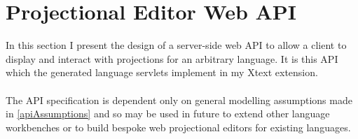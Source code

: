 \documentclass{article}
\begin{document}
\section{Projectional Editor Web API}\label{api}
In this section I present the design of a server-side web API to allow a client to display and interact with projections for an arbitrary language. It is this API which the generated language servlets implement in my Xtext extension. 
\\
\\
The API specification is dependent only on general modelling assumptions made in \ref{apiAssumptions} and so may be used in future to extend other language workbenches or to build bespoke web projectional editors for existing languages.
\end{document}
